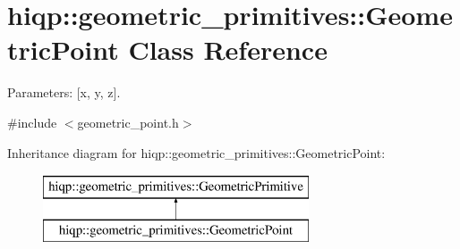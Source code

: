 \hypertarget{classhiqp_1_1geometric__primitives_1_1GeometricPoint}{\section{hiqp\-:\-:geometric\-\_\-primitives\-:\-:Geometric\-Point Class Reference}
\label{classhiqp_1_1geometric__primitives_1_1GeometricPoint}
}


Parameters\-: \mbox{[}x, y, z\mbox{]}.  




{\ttfamily \#include $<$geometric\-\_\-point.\-h$>$}

Inheritance diagram for hiqp\-:\-:geometric\-\_\-primitives\-:\-:Geometric\-Point\-:\begin{figure}[H]
\begin{center}
\leavevmode
\includegraphics[height=2.000000cm]{classhiqp_1_1geometric__primitives_1_1GeometricPoint}
\end{center}
\end{figure}

